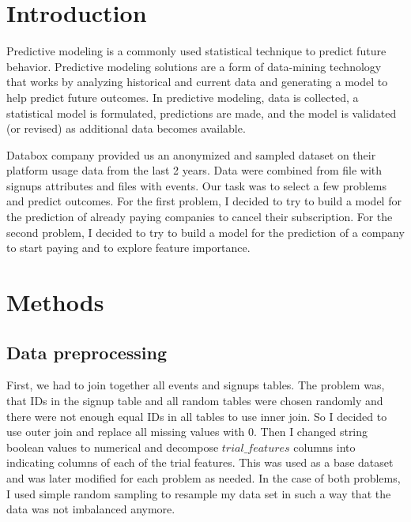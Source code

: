 \documentclass[fleqn,moreauthors,10pt]{ds_report}
\affiliation{\textsuperscript{1}\textit{vz9592@student.uni-lj.si, 63210496}}
\begin{document}
\flushbottom

\maketitle

\thispagestyle{empty}


\section*{Introduction} 
	Predictive modeling is a commonly used statistical technique to predict future behavior. Predictive modeling solutions are a form of data-mining technology that works by analyzing historical and current data and generating a model to help predict future outcomes. In predictive modeling, data is collected, a statistical model is formulated, predictions are made, and the model is validated (or revised) as additional data becomes available.
	
Databox company provided us an anonymized and sampled dataset on their platform usage data from the last 2 years.
 Data were combined
from file with signups attributes and files with events. Our task was to select a few problems and predict outcomes. For the first problem, I decided to try to build a model for the prediction of already paying companies to cancel their subscription.  For the second problem, I decided to try to build a model for the prediction of a company to start paying and to explore feature importance. 



\section*{Methods}

\subsection*{Data preprocessing}
First, we had to join together all events and signups tables. The problem was, that IDs in the signup table and all random tables were chosen randomly and there were not enough equal IDs in all tables to use inner join. So I decided to use outer join and replace all missing values with 0. Then I changed string boolean values to numerical and decompose $trial\_features$ columns into indicating columns of each of the trial features. This was used as a base dataset and was later modified for each problem as needed. In the case of both problems, I used simple random sampling to resample my data set in such a way that the data was not imbalanced anymore.
\end{document}
